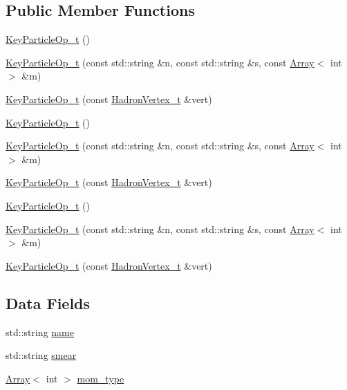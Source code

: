 \subsection*{Public Member Functions}
\begin{DoxyCompactItemize}
\item 
\mbox{\hyperlink{structHadron_1_1KeyParticleOp__t_aeb83d38886aa274e5e579d1828529809}{Key\+Particle\+Op\+\_\+t}} ()
\item 
\mbox{\hyperlink{structHadron_1_1KeyParticleOp__t_af5270bac6d21394783c83e08224d71b6}{Key\+Particle\+Op\+\_\+t}} (const std\+::string \&n, const std\+::string \&s, const \mbox{\hyperlink{classXMLArray_1_1Array}{Array}}$<$ int $>$ \&m)
\item 
\mbox{\hyperlink{structHadron_1_1KeyParticleOp__t_a11187f2c592a8404deba8a067432275e}{Key\+Particle\+Op\+\_\+t}} (const \mbox{\hyperlink{structHadron_1_1HadronVertex__t}{Hadron\+Vertex\+\_\+t}} \&vert)
\item 
\mbox{\hyperlink{structHadron_1_1KeyParticleOp__t_aeb83d38886aa274e5e579d1828529809}{Key\+Particle\+Op\+\_\+t}} ()
\item 
\mbox{\hyperlink{structHadron_1_1KeyParticleOp__t_af5270bac6d21394783c83e08224d71b6}{Key\+Particle\+Op\+\_\+t}} (const std\+::string \&n, const std\+::string \&s, const \mbox{\hyperlink{classXMLArray_1_1Array}{Array}}$<$ int $>$ \&m)
\item 
\mbox{\hyperlink{structHadron_1_1KeyParticleOp__t_a11187f2c592a8404deba8a067432275e}{Key\+Particle\+Op\+\_\+t}} (const \mbox{\hyperlink{structHadron_1_1HadronVertex__t}{Hadron\+Vertex\+\_\+t}} \&vert)
\item 
\mbox{\hyperlink{structHadron_1_1KeyParticleOp__t_aeb83d38886aa274e5e579d1828529809}{Key\+Particle\+Op\+\_\+t}} ()
\item 
\mbox{\hyperlink{structHadron_1_1KeyParticleOp__t_af5270bac6d21394783c83e08224d71b6}{Key\+Particle\+Op\+\_\+t}} (const std\+::string \&n, const std\+::string \&s, const \mbox{\hyperlink{classXMLArray_1_1Array}{Array}}$<$ int $>$ \&m)
\item 
\mbox{\hyperlink{structHadron_1_1KeyParticleOp__t_a11187f2c592a8404deba8a067432275e}{Key\+Particle\+Op\+\_\+t}} (const \mbox{\hyperlink{structHadron_1_1HadronVertex__t}{Hadron\+Vertex\+\_\+t}} \&vert)
\end{DoxyCompactItemize}
\subsection*{Data Fields}
\begin{DoxyCompactItemize}
\item 
std\+::string \mbox{\hyperlink{structHadron_1_1KeyParticleOp__t_aa2f5e2300b1f43da6209d37aa8dba130}{name}}
\item 
std\+::string \mbox{\hyperlink{structHadron_1_1KeyParticleOp__t_a5bf85aa6188a5ea919dd6fc935ef0eb5}{smear}}
\item 
\mbox{\hyperlink{classXMLArray_1_1Array}{Array}}$<$ int $>$ \mbox{\hyperlink{structHadron_1_1KeyParticleOp__t_a845158fe34d7d51f821696f3be8837be}{mom\+\_\+type}}
\end{DoxyCompactItemize}


